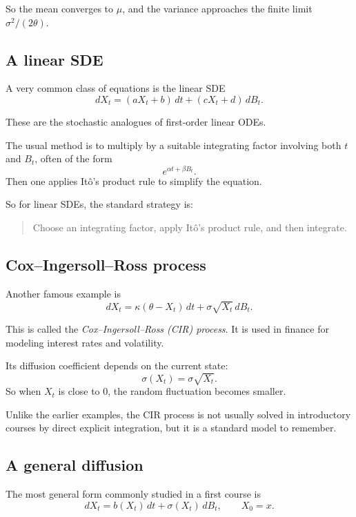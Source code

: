 \documentclass[11pt]{article}
\theoremstyle{definition}
\begin{document}
So the mean converges to \(\mu\), and the variance approaches the finite limit \(\sigma^2/(2\theta)\).

\subsection{A linear SDE}

A very common class of equations is the linear SDE
\[
dX_t = (aX_t+b)\,dt + (cX_t+d)\,dB_t.
\]

These are the stochastic analogues of first-order linear ODEs.

\medskip

\noindent
The usual method is to multiply by a suitable integrating factor involving both \(t\) and \(B_t\), often of the form
\[
e^{\alpha t+\beta B_t}.
\]
Then one applies It\^o's product rule to simplify the equation.

\medskip

\noindent
So for linear SDEs, the standard strategy is:
\begin{quote}
Choose an integrating factor, apply It\^o's product rule, and then integrate.
\end{quote}

\subsection{Cox--Ingersoll--Ross process}

Another famous example is
\[
dX_t = \kappa(\theta-X_t)\,dt+\sigma\sqrt{X_t}\,dB_t.
\]

This is called the \emph{Cox--Ingersoll--Ross (CIR) process}. It is used in finance for modeling interest rates and volatility.

\medskip

\noindent
Its diffusion coefficient depends on the current state:
\[
\sigma(X_t)=\sigma\sqrt{X_t}.
\]
So when \(X_t\) is close to \(0\), the random fluctuation becomes smaller.

\medskip

\noindent
Unlike the earlier examples, the CIR process is not usually solved in introductory courses by direct explicit integration, but it is a standard model to remember.

\subsection{A general diffusion}

The most general form commonly studied in a first course is
\[
dX_t = b(X_t)\,dt+\sigma(X_t)\,dB_t,
\qquad X_0=x.
\]
\end{document}
